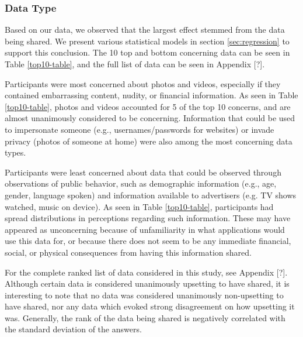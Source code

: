 
\subsubsection{Data Type}
Based on our data, we observed that the largest effect stemmed from the data being shared. We present various statistical models in section \ref{sec:regression} to support this conclusion. The 10 top and bottom concerning data can be seen in Table \ref{top10-table}, and the full list of data can be seen in Appendix [?]. 

Participants were most concerned about photos and videos, especially if they contained embarrassing content, nudity, or financial information. As seen in Table \ref{top10-table}, photos and videos accounted for 5 of the top 10 concerns, and are almost unanimously considered to be concerning. Information that could be used to impersonate someone (e.g., usernames/passwords for websites) or invade privacy (photos of someone at home) were also among the most concerning data types. 

Participants were least concerned about data that could be observed through observations of public behavior, such as demographic information (e.g., age, gender, language spoken) and information available to advertisers (e.g. TV shows watched, music on device). As seen in Table \ref{top10-table}, participants had spread distributions in perceptions regarding such information.  These may have appeared as unconcerning because of unfamiliarity in what applications would use this data for, or because there does not seem to be any immediate financial, social, or physical consequences from having this information shared.

For the complete ranked list of data considered in this study, see Appendix [?]. Although certain data is considered unanimously upsetting to have shared, it is interesting to note that no data was considered unanimously non-upsetting to have shared, nor any data which evoked strong disagreement on how upsetting it was. Generally,  the rank of the data being shared is negatively correlated with the standard deviation of the answers.

